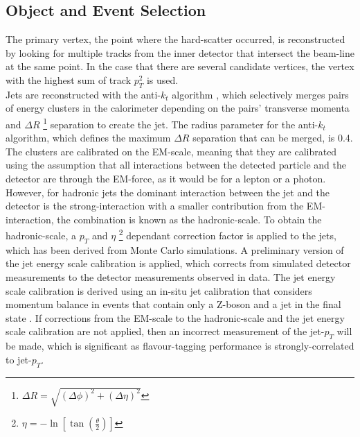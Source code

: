 \documentclass[12pt, onecolumn,notitlepage]{article}
\begin{document}
\subsection{Object and Event Selection} \label{ss_comm_event}

The primary vertex, the point where the hard-scatter occurred, is reconstructed by looking for multiple tracks from the inner detector that intersect the beam-line at the same point.
In the case that there are several candidate vertices, the vertex with the highest sum of track $p_{T}^2$ is used. \\

Jets are reconstructed with the anti-$k_{t}$ algorithm \cite{bib_AKT},
which selectively merges pairs of energy clusters in the calorimeter depending on the pairs' transverse momenta and 
$\Delta R$ \footnote{$\Delta R = \sqrt{(\Delta \phi)^2+(\Delta \eta)^2}$} separation to create the jet. 
The radius parameter for the anti-$k_{t}$ algorithm, which defines the maximum $\Delta R$ separation that can be merged, is 0.4. 
The clusters are calibrated on the EM-scale, meaning that they are calibrated using the assumption that all interactions between the detected particle and the detector are
through the EM-force, as it would be for a lepton or a photon.
However, for hadronic jets the dominant interaction between the jet and the detector is the strong-interaction with a smaller contribution from the EM-interaction,
the combination is known as the hadronic-scale.
To obtain the hadronic-scale, a $p_{T}$ and $\eta$ \footnote{\vspace{0.5mm}  $\eta = -\ln\left[\tan(\frac\theta{2})\right]$}
dependant correction factor is applied to the jets, which has been derived from Monte Carlo simulations.
A preliminary version of the jet energy scale calibration is applied, which corrects from simulated detector measurements to the detector measurements observed in data.
The jet energy scale calibration is derived using an in-situ jet calibration that considers momentum balance 
in events that contain only a Z-boson and a jet in the final state \cite{bib_JES}. 
If corrections from the EM-scale to the hadronic-scale and the jet energy scale calibration are not applied,
then an incorrect measurement of the jet-$p_{T}$ will be made, which is significant as flavour-tagging performance is strongly-correlated to jet-$p_{T}$.\\
\end{document}
